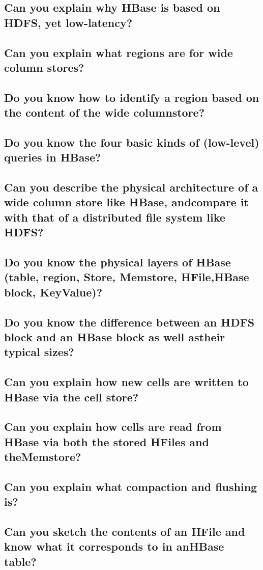 \documentclass{article}
\begin{document}
\subsection{Can you explain why HBase is based on HDFS, yet low-latency?}
\subsection{Can you explain what regions are for wide column stores?}
\subsection{Do you know how to identify a region based on the content of the wide columnstore?}
\subsection{Do you know the four basic kinds of (low-level) queries in HBase?}
\subsection{Can you describe the physical architecture of a wide column store like HBase, andcompare it with that of a distributed file system like HDFS?}
\subsection{Do you know the physical layers of HBase (table, region, Store, Memstore, HFile,HBase block, KeyValue)?}
\subsection{Do you know the difference between an HDFS block and an HBase block as well astheir typical sizes?}
\subsection{Can you explain how new cells are written to HBase via the cell store?}
\subsection{Can you explain how cells are read from HBase via both the stored HFiles and theMemstore?}
\subsection{Can you explain what compaction and flushing is?}
\subsection{Can you sketch the contents of an HFile and know what it corresponds to in anHBase table?}
\end{document}

